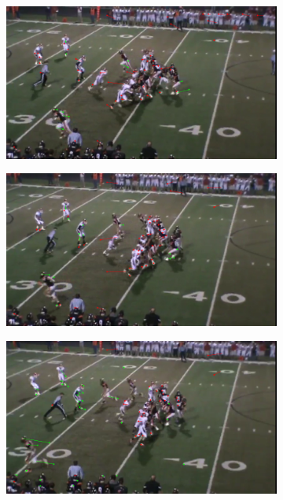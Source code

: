 \documentclass{article} %
\begin{document}
\begin{figure}
\centering
 \begin{subfigure}{.32\textwidth}
  \centering
  \includegraphics[width=1\linewidth]{img/127.png}
 \end{subfigure}\hspace{.5em}%
 \begin{subfigure}{.32\textwidth}
  \centering
  \includegraphics[width=1\linewidth]{img/132.png}
 \end{subfigure}\hspace{.5em}%
 \begin{subfigure}{.32\textwidth}
  \centering
  \includegraphics[width=1\linewidth]{img/137.png}

\end{subfigure}
\end{figure}
\end{document}
